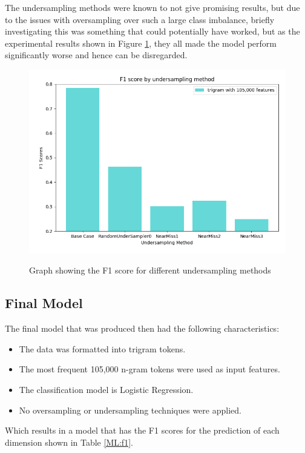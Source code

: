 The undersampling methods were known to not give promising results, but due to the issues with oversampling over such a large class imbalance, briefly investigating this was something that could potentially have worked, but as the experimental results shown in Figure \ref{undersamplegraph}, they all made the model perform significantly worse and hence can be disregarded.

\begin{figure}[ht]
\caption{Graph showing the F1 score for different undersampling methods}
\centering
\includegraphics[scale=0.6]{graphs/undersample.png}
\label{undersamplegraph}
\end{figure}

\pagebreak

\subsection{Final Model}

The final model that was produced then had the following characteristics: 

\begin{itemize}
    \item The data was formatted into trigram tokens.
    \item The most frequent 105,000 n-gram tokens were used as input features.
    \item The classification model is Logistic Regression.
    \item No oversampling or undersampling techniques were applied.
\end{itemize}

Which results in a model that has the F1 scores for the prediction of each dimension shown in Table \ref{ML:f1}.

